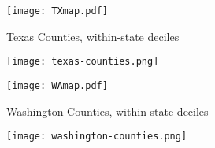\documentclass[10pt]{article}
\begin{document}
\begin{figure} 
  \begin{center}
    \caption{Texas Counties, within-state deciles}
    \texttt{[image: TXmap.pdf]}
  \end{center}
\end{figure}

\begin{figure} 
  \begin{center}
    \texttt{[image: texas-counties.png]}
  \end{center}
\end{figure}

\begin{landscape}

\end{landscape}

\begin{landscape}
\begin{figure} 
  \begin{center}
    \caption{Washington Counties, within-state deciles}
    \texttt{[image: WAmap.pdf]}
  \end{center}
\end{figure}
\end{landscape}

\begin{landscape}
\begin{figure} 
  \begin{center}
    \texttt{[image: washington-counties.png]}
  \end{center}
\end{figure}
\end{landscape}

\begin{landscape}

\end{landscape}
\end{document}
